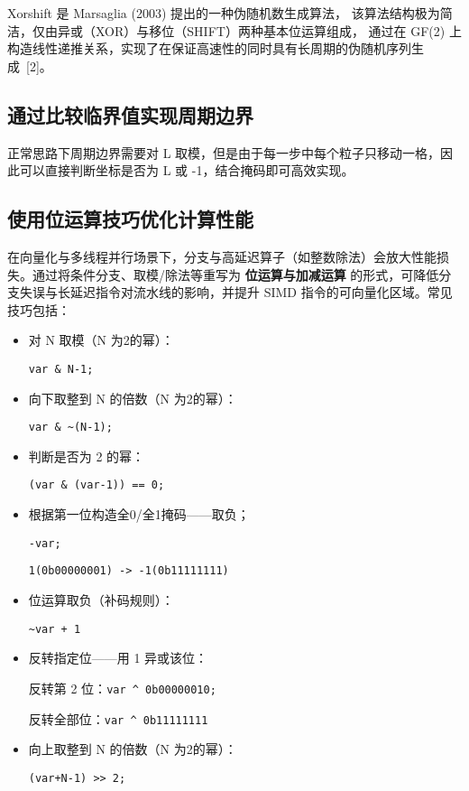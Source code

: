 \documentclass[a4paper,12pt]{article}
\begin{document}
\begin{CJK}{UTF8}{gbsn}
	Xorshift 是 Marsaglia (2003) 提出的一种伪随机数生成算法，
	该算法结构极为简洁，仅由异或（XOR）与移位（SHIFT）两种基本位运算组成，
	通过在 GF(2) 上构造线性递推关系，实现了在保证高速性的同时具有长周期的伪随机序列生成~[2]。

	\subsection{通过比较临界值实现周期边界}
	正常思路下周期边界需要对 L 取模，但是由于每一步中每个粒子只移动一格，因此可以直接判断坐标是否为 L 或 -1，结合掩码即可高效实现。

	\subsection{使用位运算技巧优化计算性能}
	在向量化与多线程并行场景下，分支与高延迟算子（如整数除法）会放大性能损失。通过将条件分支、取模/除法等重写为 \textbf{位运算与加减运算} 的形式，可降低分支失误与长延迟指令对流水线的影响，并提升 SIMD 指令的可向量化区域。常见技巧包括：
	\begin{itemize}
		\item 对 N 取模（N 为2的幂）：

		      \texttt{var \& N-1;}


		\item 向下取整到 N 的倍数（N 为2的幂）：

		      \texttt{var \& \~{}(N-1);}

		\item 判断是否为 2 的幂：

		      \texttt{(var \& (var-1)) == 0;}

		\item 根据第一位构造全0/全1掩码——取负；

		      \texttt{-var;}

		      \texttt{1(0b00000001) -> -1(0b11111111)}

		\item 位运算取负（补码规则）：

		      \texttt{\~{}var + 1}

		\item 反转指定位——用 1 异或该位：

		      反转第 2 位：\texttt{var \^{} 0b00000010;}

		      反转全部位：\texttt{var \^{} 0b11111111}

		\item 向上取整到 N 的倍数（N 为2的幂）：

		      \texttt{(var+N-1) >> 2;}
	\end{itemize}




\end{CJK}
\end{document}

